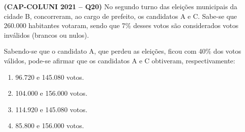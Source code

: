 \textbf{(CAP-COLUNI 2021 -- Q20)} No segundo turno das eleições municipais da cidade B, concorreram, ao cargo de prefeito, os candidatos A e C. Sabe-se que 260.000 habitantes votaram, sendo que 7\% desses votos são considerados votos inválidos (brancos ou nulos).

Sabendo-se que o candidato A, que perdeu as eleições, ficou com 40\% dos votos válidos, pode-se afirmar que os candidatos A e C obtiveram, respectivamente:

\begin{enumerate}
	\item 96.720 e 145.080 votos.
	\item 104.000 e 156.000 votos.
	\item 114.920 e 145.080 votos.
	\item 85.800 e 156.000 votos.
\end{enumerate}
